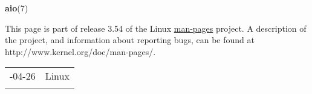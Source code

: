 \documentclass[]{article}
\let\realtextbf=\textbf
\renewcommand{\textbf}[1]{\textcolor{boldcolor}{\realtextbf{#1}}}
\renewcommand{\emph}[1]{\underline{#1}}
\begin{document}
\textbf{aio}(7)


This page is part of release 3.54 of the Linux \emph{man-pages} project.
A description of the project, and information about reporting bugs, can
be found at http://www.kernel.org/doc/man-pages/.

\begin{longtable}[c]{@{}ll@{}}
\toprule\addlinespace
2012-04-26 & Linux
\\\addlinespace
\bottomrule
\end{longtable}
\end{document}
